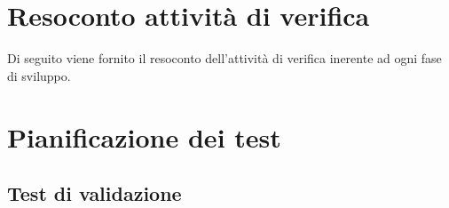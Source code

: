 \documentclass[a4paper,11pt]{article}
\begin{document}
\section{Resoconto attività di verifica}
Di seguito viene fornito il resoconto dell'attività di verifica inerente ad ogni fase di sviluppo.


\newpage
\section{Pianificazione dei test}
\label{Appendice D}
\subsection{Test di validazione}
\end{document}
